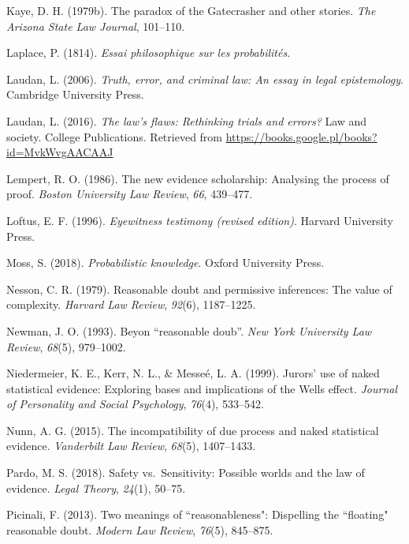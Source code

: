\documentclass[10pt,dvipsnames,enabledeprecatedfontcommands]{scrartcl}
\begin{document}
\hypertarget{ref-Kaye79gate}{}
Kaye, D. H. (1979b). The paradox of the Gatecrasher and other stories.
\emph{The Arizona State Law Journal}, 101--110.

\hypertarget{ref-Laplace1814}{}
Laplace, P. (1814). \emph{Essai philosophique sur les probabilités}.

\hypertarget{ref-laudan2006truth}{}
Laudan, L. (2006). \emph{Truth, error, and criminal law: An essay in
legal epistemology}. Cambridge University Press.

\hypertarget{ref-laudan2016law}{}
Laudan, L. (2016). \emph{The law's flaws: Rethinking trials and errors?}
Law and society. College Publications. Retrieved from
\url{https://books.google.pl/books?id=MvkWvgAACAAJ}

\hypertarget{ref-Lempert1986}{}
Lempert, R. O. (1986). The new evidence scholarship: Analysing the
process of proof. \emph{Boston University Law Review}, \emph{66},
439--477.

\hypertarget{ref-Loftus1996}{}
Loftus, E. F. (1996). \emph{Eyewitness testimony (revised edition)}.
Harvard University Press.

\hypertarget{ref-moss2018}{}
Moss, S. (2018). \emph{Probabilistic knowledge}. Oxford University
Press.

\hypertarget{ref-Nesson1979Reasonable-doub}{}
Nesson, C. R. (1979). Reasonable doubt and permissive inferences: The
value of complexity. \emph{Harvard Law Review}, \emph{92}(6),
1187--1225.

\hypertarget{ref-newman1993}{}
Newman, J. O. (1993). Beyon ``reasonable doub''. \emph{New York
University Law Review}, \emph{68}(5), 979--1002.

\hypertarget{ref-niedermeierEtAl1999}{}
Niedermeier, K. E., Kerr, N. L., \& Messeé, L. A. (1999). Jurors' use of
naked statistical evidence: Exploring bases and implications of the
Wells effect. \emph{Journal of Personality and Social Psychology},
\emph{76}(4), 533--542.

\hypertarget{ref-nunn2015}{}
Nunn, A. G. (2015). The incompatibility of due process and naked
statistical evidence. \emph{Vanderbilt Law Review}, \emph{68}(5),
1407--1433.

\hypertarget{ref-pardo2018}{}
Pardo, M. S. (2018). Safety vs.~Sensitivity: Possible worlds and the law
of evidence. \emph{Legal Theory}, \emph{24}(1), 50--75.

\hypertarget{ref-picinali2013}{}
Picinali, F. (2013). Two meanings of ``reasonableness": Dispelling the
``floating" reasonable doubt. \emph{Modern Law Review}, \emph{76}(5),
845--875.
\end{document}
